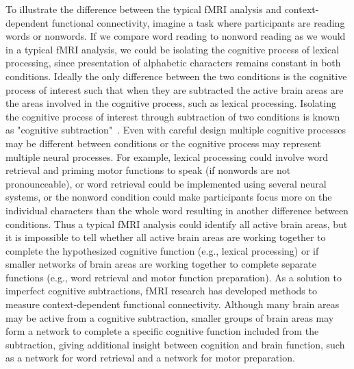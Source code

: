 \documentclass[phd,figures,tables,ackpage,abstractpage,publicabstractpage]{uithesis}
\begin{document}
To illustrate the difference between the typical fMRI analysis and context-dependent
functional connectivity, imagine a task where participants are reading words
or nonwords.
If we compare word reading to nonword reading as we would in a typical
fMRI analysis, we could be isolating the cognitive process of lexical processing,
since presentation of alphabetic characters
remains constant in both conditions.
Ideally the only difference between the two conditions is the cognitive process
of interest such that when they are subtracted the active brain areas are
the areas involved in the cognitive process, such as lexical processing.
Isolating the cognitive process of interest through subtraction of two conditions
is known as "cognitive subtraction"~\cite{Sartori2000,Friston1996b}.
Even with careful design multiple cognitive processes may be
different between conditions or the cognitive process may represent multiple
neural processes.
For example, lexical processing could involve word retrieval and priming motor functions
to speak (if nonwords are not pronounceable), or word retrieval could be implemented
using several neural systems, or the nonword condition could make participants focus more
on the individual characters than the whole word resulting in another difference between conditions.
Thus a typical fMRI analysis could identify all active brain areas,
but it is impossible to tell whether all active brain areas
are working together to complete the hypothesized cognitive function
(e.g., lexical processing) or if smaller networks of brain areas
are working together to complete separate functions (e.g., word retrieval and
motor function preparation).
As a solution to imperfect cognitive subtractions, fMRI research has
developed methods to measure context-dependent functional connectivity.
Although many brain areas may be active from a cognitive subtraction,
smaller groups of brain areas may form a network to complete a specific
cognitive function included from the subtraction, giving additional
insight between cognition and brain function, such as a network for word retrieval and
a network for motor preparation.
\end{document}
